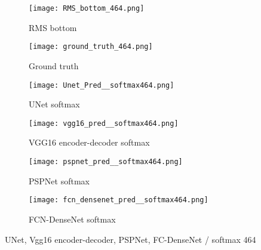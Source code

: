 	\begin{figure}[!h]
		\centering
		\begin{subfigure}[b]{0.47\textwidth}
			\centering
			\texttt{[image: RMS\_bottom\_464.png]}
			\caption{RMS bottom}
			\label{fig:RMS_flat_shell_Vz_464}
		\end{subfigure}
		\hfill
		\begin{subfigure}[b]{0.47\textwidth}
			\centering
			\texttt{[image: ground\_truth\_464.png]}
			\caption{Ground truth}
			\label{fig:m1_rand_single_delam_464}
		\end{subfigure}
		\begin{subfigure}[b]{0.47\textwidth}
			\centering
			\texttt{[image: Unet\_Pred\_\_softmax464.png]}
			\caption{UNet softmax}
			\label{fig:Unet_Pred__softmax464}
		\end{subfigure}
		\hfill
		\begin{subfigure}[b]{0.47\textwidth}
			\centering
			\texttt{[image: vgg16\_pred\_\_softmax464.png]}
			\caption{VGG16 encoder-decoder softmax}			\label{fig:vgg16_pred__softmax464}			
		\end{subfigure}
		\hfill
		\begin{subfigure}[b]{0.47\textwidth}
			\centering
			\texttt{[image: pspnet\_pred\_\_softmax464.png]}
			\caption{PSPNet softmax}
			\label{fig:pspnet_pred__softmax464}
		\end{subfigure}	
		\hfill
		\begin{subfigure}[b]{0.47\textwidth}
			\centering
			\texttt{[image: fcn\_densenet\_pred\_\_softmax464.png]}
			\caption{FCN-DenseNet softmax}
			\label{fig:fcn_densenet_pred__softmax464}
		\end{subfigure}	
		\caption{UNet, Vgg16 encoder-decoder, PSPNet, FC-DenseNet / softmax 464}
		\label{fig:464_softmax}
	\end{figure}
	
	
	
	

